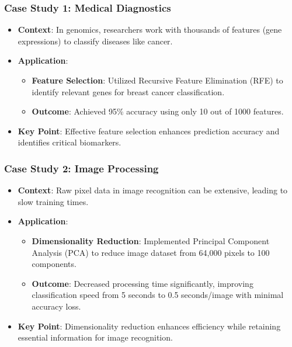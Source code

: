 \documentclass{beamer}
\begin{document}
\begin{frame}[fragile]
    \frametitle{Case Study 1: Medical Diagnostics}

    \begin{itemize}
        \item \textbf{Context}: In genomics, researchers work with thousands of features (gene expressions) to classify diseases like cancer.
        \item \textbf{Application}:
            \begin{itemize}
                \item \textbf{Feature Selection}: Utilized Recursive Feature Elimination (RFE) to identify relevant genes for breast cancer classification.
                \item \textbf{Outcome}: Achieved 95\% accuracy using only 10 out of 1000 features.
            \end{itemize}
        \item \textbf{Key Point}: Effective feature selection enhances prediction accuracy and identifies critical biomarkers.
    \end{itemize}
\end{frame}

\begin{frame}[fragile]
    \frametitle{Case Study 2: Image Processing}

    \begin{itemize}
        \item \textbf{Context}: Raw pixel data in image recognition can be extensive, leading to slow training times.
        \item \textbf{Application}:
            \begin{itemize}
                \item \textbf{Dimensionality Reduction}: Implemented Principal Component Analysis (PCA) to reduce image dataset from 64,000 pixels to 100 components.
                \item \textbf{Outcome}: Decreased processing time significantly, improving classification speed from 5 seconds to 0.5 seconds/image with minimal accuracy loss.
            \end{itemize}
        \item \textbf{Key Point}: Dimensionality reduction enhances efficiency while retaining essential information for image recognition.
    \end{itemize}
\end{frame}
\end{document}
